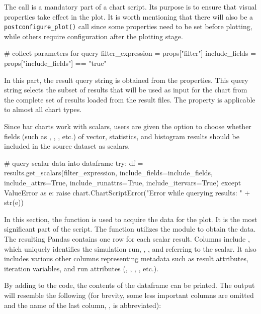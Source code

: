 The  call is a mandatory part of a chart script. Its
purpose is to ensure that visual properties take effect in the plot. It is worth
mentioning that there will also be a \texttt{postconfigure\_plot()} call since
some properties need to be set before plotting, while others require
configuration after the plotting stage.

\begin{python}
# collect parameters for query
filter_expression = props["filter"]
include_fields = props["include_fields"] == "true"
\end{python}

In this part, the result query string is obtained from the properties. This
query string selects the subset of results that will be used as input for the
chart from the complete set of results loaded from the result files. The
 property is applicable to almost all chart types.

Since bar charts work with scalars, users are given the option to choose whether
fields (such as , , , etc.) of vector,
statistics, and histogram results should be included in the source dataset as
scalars.

\begin{python}
# query scalar data into dataframe
try:
    df = results.get_scalars(filter_expression, include_fields=include_fields,
             include_attrs=True, include_runattrs=True, include_itervars=True)
except ValueError as e:
    raise chart.ChartScriptError("Error while querying results: " + str(e))
\end{python}

In this section, the  function is used to acquire
the data for the plot. It is the most significant part of the script. The
function utilizes the  module to obtain the data. The resulting
Pandas  contains one row for each scalar result. Columns include
, which uniquely identifies the simulation run, ,
, and  referring to the scalar. It also includes various
other columns representing metadata such as result attributes, iteration
variables, and run attributes (, , ,
, etc.).

By adding  to the code, the contents of the dataframe can be
printed. The output will resemble the following (for brevity, some less
important columns are omitted and the name of the last column, ,
is abbreviated):

